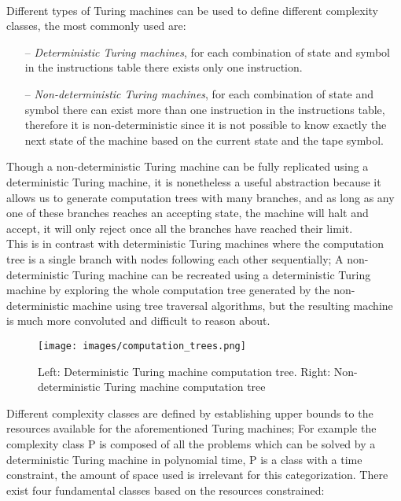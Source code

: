 \\Different types of Turing machines can be used to define different complexity classes, the most commonly used are:
\begin{itemize}
	\item[--] \textit{Deterministic Turing machines}, for each combination of state and symbol in the instructions table there exists only one instruction. 
	\item[--] \textit{Non-deterministic Turing machines}, for each combination of state and symbol there can exist more than one instruction in the instructions table, therefore it is non-deterministic since it is not possible to know exactly the next state of the machine based on the current state and the tape symbol.
\end{itemize}
Though a non-deterministic Turing machine can be fully replicated using a deterministic Turing machine, it is nonetheless a useful abstraction because it allows us to generate computation trees with many branches, and as long as any one of these branches reaches an accepting state, the machine will halt and accept, it will only reject once all the branches have reached their limit. 
\\This is in contrast with deterministic Turing machines where the computation tree is a single branch with nodes following each other sequentially; A non-deterministic Turing machine can be recreated using a deterministic Turing machine by exploring the whole computation tree generated by the non-deterministic machine using tree traversal algorithms, but the resulting machine is much more convoluted and difficult to reason about.
\begin{figure}[!ht]
	\centering
	\texttt{[image: images/computation\_trees.png]}
	\caption{ Left: Deterministic Turing machine computation tree. Right: Non-deterministic Turing machine computation tree}
	\label{fig:Computation Trees}
\end{figure}

Different complexity classes are defined by establishing upper bounds to the resources available for the aforementioned Turing machines; For example the complexity class P is composed of all the problems which can be solved by a deterministic Turing machine in polynomial time, P is a class with a time constraint, the amount of space used is irrelevant for this categorization.
There exist four fundamental classes based on the resources constrained:

